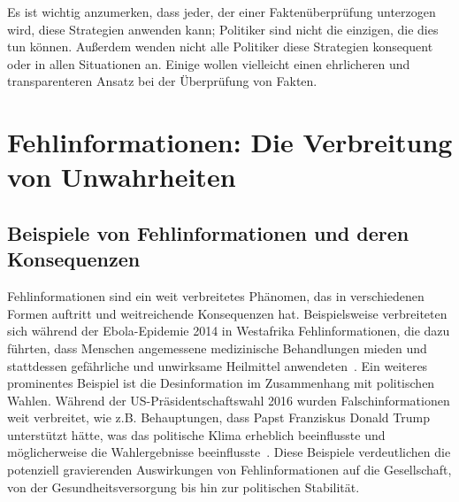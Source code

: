 \documentclass[a4paper,listof=totoc,bibliography=totoc]{scrartcl}
\begin{document}
Es ist wichtig anzumerken, dass jeder, der einer Faktenüberprüfung unterzogen wird, diese Strategien anwenden kann; Politiker sind nicht die einzigen, die dies tun können. 
Außerdem wenden nicht alle Politiker diese Strategien konsequent oder in allen Situationen an. Einige wollen vielleicht einen ehrlicheren und transparenteren Ansatz bei 
der Überprüfung von Fakten.

\section{Fehlinformationen: Die Verbreitung von Unwahrheiten}

\subsection{Beispiele von Fehlinformationen und deren Konsequenzen}

Fehlinformationen sind ein weit verbreitetes Phänomen, das in verschiedenen Formen auftritt und weitreichende Konsequenzen hat. Beispielsweise verbreiteten sich 
während der Ebola-Epidemie 2014 in Westafrika Fehlinformationen, die dazu führten, dass Menschen angemessene medizinische Behandlungen mieden und stattdessen gefährliche 
und unwirksame Heilmittel anwendeten~\cite{vinck2019}. 
Ein weiteres prominentes Beispiel ist die Desinformation im Zusammenhang mit politischen Wahlen. Während der US-Präsidentschaftswahl 2016 wurden Falschinformationen weit 
verbreitet, wie z.B. Behauptungen, dass Papst Franziskus Donald Trump unterstützt hätte, was das politische Klima erheblich beeinflusste und möglicherweise die Wahlergebnisse 
beeinflusste~\cite{allcott2017}.
Diese Beispiele verdeutlichen die potenziell gravierenden Auswirkungen von Fehlinformationen auf die Gesellschaft, von der Gesundheitsversorgung bis hin zur politischen Stabilität.
\end{document}
